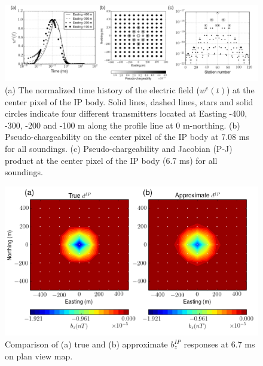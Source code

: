 \documentclass[a4paper, 11pt]{article}
\begin{document}
\begin{figure}[htb]
  \centering
  \includegraphics[width=1.\textwidth]{figures/Equivalent_peta.png}
  \caption{(a) The normalized time history of the electric field ($w^e(t)$) at the center pixel of the IP body. Solid lines, dashed lines, stars and solid circles indicate four different transmitters located at Easting -400, -300, -200 and -100 m  along the profile line at 0 m-northing.
  (b) Pseudo-chargeability on the center pixel of the IP body at 7.08 ms for all soundings.
  (c) Pseudo-chargeability and Jacobian (P-J) product at the center pixel of the IP body (6.7 ms) for all soundings.
  }
  \label{F:Equivalent_peta}
\end{figure}

\begin{figure}[htb]
  \centering
  \includegraphics[width=1.\textwidth]{figures/EquivPeta_True_Approx.png}
  \caption{Comparison of (a) true and (b) approximate $b_z^{IP}$ responses at 6.7 ms on plan view map.}
  \label{F:EquivPeta_True_Approx}
\end{figure}
\clearpage

\end{document}

